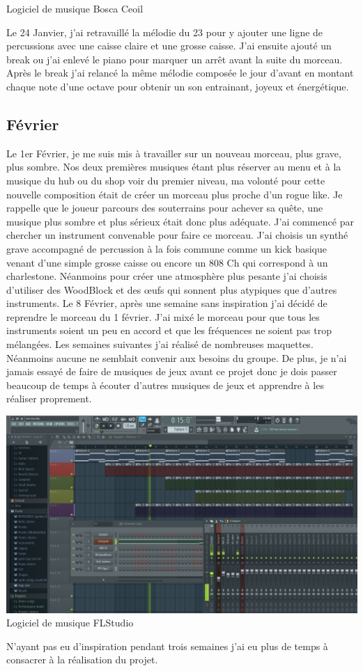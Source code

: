 \documentclass[]{extarticle}
\begin{document}
\begin{spacing}{1.25}
\begin{center}
\bigbreak
Logiciel de musique Bosca Ceoil
\end{center}
\bigbreak
\bigbreak
Le 24 Janvier, j’ai retravaillé la mélodie du 23 pour y ajouter une ligne de percussions avec une caisse claire et une grosse caisse. J’ai ensuite ajouté un break ou j’ai enlevé le piano pour marquer un arrêt avant la suite du morceau. Après le break j’ai relancé la même mélodie composée le jour d’avant en montant chaque note d’une octave pour obtenir un son entrainant, joyeux et énergétique. 
\newpage

\subsection{Février}
\bigbreak
\bigbreak
Le 1er Février, je me suis mis à travailler sur un nouveau morceau, plus grave, plus sombre. Nos deux premières musiques étant plus réserver au menu et à la musique du hub ou du shop voir du premier niveau, ma volonté pour cette nouvelle composition était de créer un morceau plus proche d’un rogue like. Je rappelle que le joueur parcours des souterrains pour achever sa quête, une musique plus sombre et plus sérieux était donc plus adéquate. J’ai commencé par chercher un instrument convenable pour faire ce morceau. J’ai choisis un synthé grave accompagné de percussion à la fois commune comme un kick basique venant d’une simple grosse caisse ou encore un 808 Ch qui correspond à un charlestone. Néanmoins pour créer une atmosphère plus pesante j’ai choisis d’utiliser des WoodBlock et des œufs qui sonnent plus atypiques que d’autres instruments.
\bigbreak
Le 8 Février, après une semaine sans inspiration j’ai décidé de reprendre le morceau du 1 février. J’ai mixé le morceau pour que tous les instruments soient un peu en accord et que les fréquences ne soient pas trop mélangées.
\bigbreak
Les semaines suivantes j’ai réalisé de nombreuses maquettes. Néanmoins aucune ne semblait convenir aux besoins du groupe. De plus, je n’ai jamais essayé de faire de musiques de jeux avant ce projet donc je dois passer beaucoup de temps à écouter d’autres musiques de jeux et apprendre à les réaliser proprement.
\bigbreak
\begin{center}
\includegraphics[scale = 0.18]{fruitloop.png}
\bigbreak
Logiciel de musique FLStudio
\end{center}
\bigbreak
N’ayant pas eu d’inspiration pendant trois semaines j’ai eu plus de temps à consacrer à la réalisation du projet. 
\newpage


\end{spacing}
\end{document}
